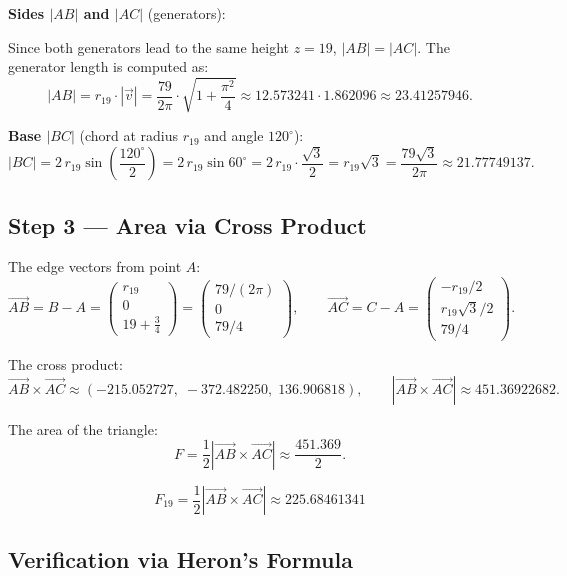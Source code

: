 \textbf{Sides $|AB|$ and $|AC|$} (generators):

Since both generators lead to the same height $z = 19$,
$|AB| = |AC|$. The generator length is computed as:
\[
  |AB|
  = r_{19}\cdot|\vec{v}|
  = \frac{79}{2\pi}\cdot\sqrt{1+\frac{\pi^2}{4}}
  \approx 12.573241\cdot 1.862096
  \approx 23.41257946.
\]

\textbf{Base $|BC|$} (chord at radius $r_{19}$ and angle $120^\circ$):
\[
  |BC|
  = 2\,r_{19}\sin\!\left(\frac{120^\circ}{2}\right)
  = 2\,r_{19}\sin 60^\circ
  = 2\,r_{19}\cdot\frac{\sqrt{3}}{2}
  = r_{19}\sqrt{3}
  = \frac{79\sqrt{3}}{2\pi}
  \approx 21.77749137.
\]

\subsection*{Step 3 --- Area via Cross Product}

The edge vectors from point $A$:
\[
  \overrightarrow{AB} = B - A
  = \begin{pmatrix}r_{19}\\0\\19+\tfrac{3}{4}\end{pmatrix}
  = \begin{pmatrix}79/(2\pi)\\0\\79/4\end{pmatrix},
  \qquad
  \overrightarrow{AC} = C - A
  = \begin{pmatrix}-r_{19}/2\\ r_{19}\sqrt{3}/2\\79/4\end{pmatrix}.
\]

The cross product:
\[
  \overrightarrow{AB}\times\overrightarrow{AC}
  \approx (-215.052727,\; -372.482250,\; 136.906818),
  \qquad
  \left|\overrightarrow{AB}\times\overrightarrow{AC}\right|
  \approx 451.36922682.
\]

The area of the triangle:
\[
  F
  = \frac{1}{2}\left|\overrightarrow{AB}\times\overrightarrow{AC}\right|
  \approx \frac{451.369}{2}.
\]

\begin{satz}[Triangular Area at $n=19$]
\begin{equation}
  \boxed{F_{19} = \frac{1}{2}\left|\overrightarrow{AB}\times\overrightarrow{AC}\right|
  \approx 225.68461341}
\end{equation}
\end{satz}

\subsection*{Verification via Heron's Formula}

